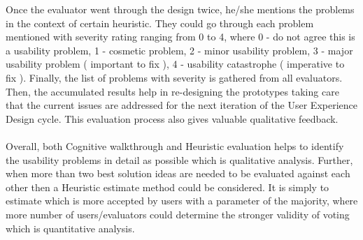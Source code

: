 Once the evaluator went through the design twice, he/she mentions the problems in the context of certain heuristic. They could go through each problem mentioned with severity rating ranging from 0 to 4, where 0 - do not agree this is a usability problem, 1 - cosmetic problem, 2 - minor usability problem, 3 - major usability problem ( important to fix ), 4 - usability catastrophe ( imperative to fix ). Finally, the list of problems with severity is gathered from all evaluators. Then, the accumulated results help in re-designing the prototypes taking care that the current issues are addressed for the next iteration of the User Experience Design cycle. This evaluation process also gives valuable qualitative feedback. \\ \\

Overall, both Cognitive walkthrough and Heuristic evaluation helps to identify the usability problems in detail as possible which is qualitative analysis. Further, when more than two best solution ideas are needed to be evaluated against each other then a Heuristic estimate method could be considered. It is simply to estimate which is more accepted by users with a parameter of the majority, where more number of users/evaluators could determine the stronger validity of voting which is quantitative analysis. \\ \\

\let\cleardoublepage\clearpage